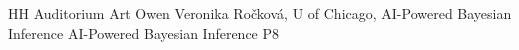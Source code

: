 {HH Auditorium}	%
{Art Owen}		%
{Veronika Ročková, U of Chicago, AI-Powered Bayesian Inference}	%
{AI-Powered Bayesian Inference}		%
{P8}		%
\\\hline

